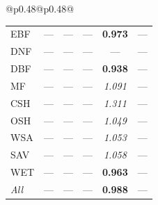 \begin{table}[htbp]
\begin{tabular}{@{}p{0.48\linewidth}@{\hspace{0.04\linewidth}}p{0.48\linewidth}@{}}
\begin{tabular}{lccccc}
EBF & --- & --- & --- & \textbf{0.973} & --- \\
DNF & --- & --- & --- & --- & --- \\
DBF & --- & --- & --- & \textbf{0.938} & --- \\
MF & --- & --- & --- & \textit{1.091} & --- \\
CSH & --- & --- & --- & \textit{1.311} & --- \\
OSH & --- & --- & --- & \textit{1.049} & --- \\
WSA & --- & --- & --- & \textit{1.053} & --- \\
SAV & --- & --- & --- & \textit{1.058} & --- \\
WET & --- & --- & --- & \textbf{0.963} & --- \\
\midrule
\textit{All} & --- & --- & --- & \textbf{0.988} & --- \\
\bottomrule
\end{tabular} \\
\end{tabular}
\end{table}
